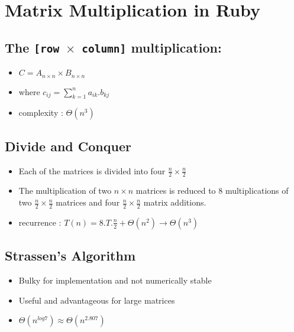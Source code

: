 \documentclass[11pt, letterpaper, oneside]{article}
\begin{document}




\section{Matrix Multiplication in Ruby}


\subsection{The \texttt{[row $\times$ column]} multiplication:}
	\begin{itemize}
	\item $ C = A_{n \times n} \times B_{n \times n}$
	\item where $ c_{ij} = \sum\limits_{k=1}^n a_{ik} . b_{kj}   $
	\item complexity : $\Theta(n^3)$ \\
	\end{itemize}


\subsection{Divide and Conquer}

	\begin{itemize}
	
        \item Each of the matrices is divided into four $\frac{n}{2} \times \frac{n}{2}$
	\item The multiplication of two $ n \times  n $ matrices is reduced to 8 multiplications of 
	two $\frac{n}{2} \times \frac{n}{2}$ matrices and four $\frac{n}{2} \times \frac{n}{2}$ matrix additions.
	\item recurrence : $T(n) = 8.T. \frac{n}{2} + \Theta(n^2) \rightarrow \Theta(n^3)$ \\
	\end{itemize}

\subsection{Strassen's Algorithm}

	\begin{itemize}
	
        \item Bulky for implementation and not numerically stable
        \item Useful and advantageous for large matrices
	\item $ \Theta(n^{log7}) \approx \Theta(n^{2.807})$ \\
	\end{itemize}
\end{document}
